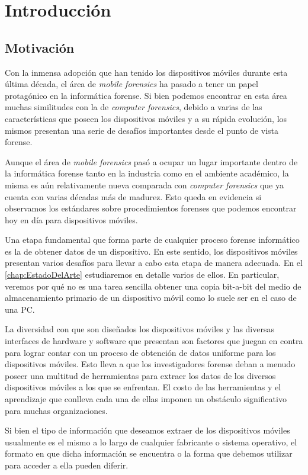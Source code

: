 \chapter{Introducción} \label{introduccion}

\section{Motivación}
Con la inmensa adopción que han tenido los dispositivos móviles durante esta última década, el área de \emph{mobile forensics} ha pasado a tener un papel protagónico en la informática forense. Si bien podemos encontrar en esta área muchas similitudes con la de \emph{computer forensics}, debido a varias de las características que poseen los dispositivos móviles y a su rápida evolución, los mismos presentan una serie de desafíos importantes desde el punto de vista forense.

Aunque el área de \emph{mobile forensics} pasó a ocupar un lugar importante dentro de la informática forense tanto en la industria como en el ambiente académico, la misma es aún relativamente nueva comparada con \emph{computer forensics} que ya cuenta con varias décadas más de madurez. Esto queda en evidencia si observamos los estándares sobre procedimientos forenses que podemos encontrar hoy en día para dispositivos móviles.

Una etapa fundamental que forma parte de cualquier proceso forense informático es la de obtener datos de un dispositivo. En este sentido, los dispositivos móviles presentan varios desafíos para llevar a cabo esta etapa de manera adecuada. En el \autoref{chap:EstadoDelArte} estudiaremos en detalle varios de ellos. En particular, veremos por qué no es una tarea sencilla obtener una copia bit-a-bit del medio de almacenamiento primario de un dispositivo móvil como lo suele ser en el caso de una PC.

La diversidad con que son diseñados los dispositivos móviles y las diversas interfaces de hardware y software que presentan son factores que juegan en contra para lograr contar con un proceso de obtención de datos uniforme para los dispositivos móviles. Esto lleva a que los investigadores forense deban a menudo poseer una multitud de herramientas para extraer los datos de los diversos dispositivos móviles a los que se enfrentan. El costo de las herramientas y el aprendizaje que conlleva cada una de ellas imponen un obstáculo significativo para muchas organizaciones.

Si bien el tipo de información que deseamos extraer de los dispositivos móviles usualmente es el mismo a lo largo de cualquier fabricante o sistema operativo, el formato en que dicha información se encuentra o la forma que debemos utilizar para acceder a ella pueden diferir.

